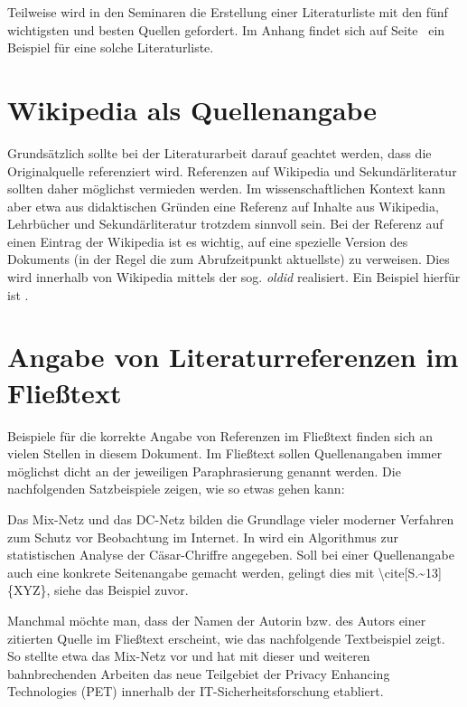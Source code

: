 \documentclass[
    fontsize=12pt,
    headings=small,
    parskip=half,           %
    bibliography=totoc,
    numbers=noenddot,       %
    open=any,               %
    ]{scrreprt}
\begin{document}
Teilweise wird in den Seminaren die Erstellung einer Literaturliste mit den fünf wichtigsten und besten Quellen gefordert. Im Anhang findet sich auf Seite~\pageref{sec:literaturliste} ein Beispiel für eine solche Literaturliste.

\section{Wikipedia als Quellenangabe}

Grundsätzlich sollte bei der Literaturarbeit darauf geachtet werden, dass die Originalquelle
referenziert wird. Referenzen auf Wikipedia und Sekundärliteratur sollten daher möglichst vermieden werden. Im wissenschaftlichen Kontext kann aber etwa aus didaktischen Gründen eine Referenz auf Inhalte aus Wikipedia, Lehrbücher und Sekundärliteratur trotzdem sinnvoll sein. Bei der Referenz auf einen Eintrag der Wikipedia ist es wichtig, auf eine spezielle Version des Dokuments (in der Regel die zum Abrufzeitpunkt aktuellste) zu verweisen. Dies wird innerhalb von Wikipedia mittels der sog. \emph{oldid} realisiert. Ein Beispiel hierfür ist \cite{Wiki}.

\section{Angabe von Literaturreferenzen im Fließtext}
\label{sec:literaturfliesstext}

Beispiele für die korrekte Angabe von Referenzen im Fließtext finden sich an vielen Stellen in diesem Dokument. Im Fließtext sollen Quellenangaben immer möglichst dicht an der jeweiligen Paraphrasierung genannt werden. Die nachfolgenden Satzbeispiele zeigen, wie so etwas gehen kann:

Das Mix-Netz \cite{Chau81} und das DC-Netz \cite{Chau88} bilden die Grundlage vieler moderner Verfahren zum Schutz vor Beobachtung im Internet. In \cite[S.~13]{Beut2009} wird ein Algorithmus zur statistischen Analyse der Cäsar-Chriffre angegeben. Soll bei einer Quellenangabe auch eine konkrete Seitenangabe gemacht werden, gelingt dies mit \textbackslash cite[S.\textasciitilde 13]\{XYZ\}, siehe das Beispiel zuvor.

Manchmal möchte man, dass der Namen der Autorin bzw. des Autors einer zitierten Quelle im Fließtext erscheint, wie das nachfolgende Textbeispiel zeigt. So stellte etwa \textcite{Chau81} das Mix-Netz vor und hat mit dieser und weiteren bahnbrechenden Arbeiten das neue Teilgebiet der Privacy Enhancing Technologies (PET) innerhalb der IT-Sicherheitsforschung etabliert.
\end{document}
